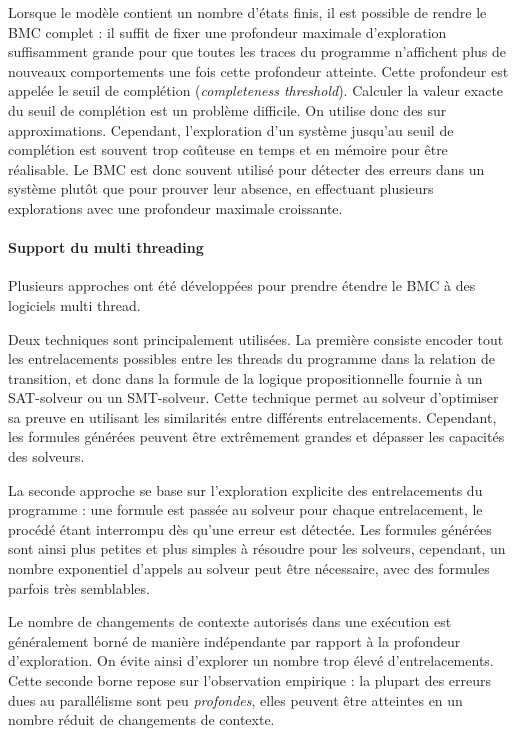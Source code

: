 Lorsque le modèle contient un nombre d'états finis, il est possible de rendre le
\ac{BMC} complet : il suffit de fixer une profondeur maximale d'exploration
suffisamment grande pour que toutes les traces du programme n'affichent plus de
nouveaux comportements une fois cette profondeur atteinte. Cette profondeur est appelée le seuil de
complétion (\emph{completeness threshold}). Calculer la valeur exacte du seuil de
complétion est un problème difficile. On utilise donc des sur approximations.
Cependant, l'exploration d'un système jusqu'au seuil de complétion est souvent
trop coûteuse en temps et en mémoire pour être réalisable. Le \ac{BMC} est donc
souvent utilisé pour détecter des erreurs dans un système plutôt que pour
prouver leur absence, en effectuant plusieurs explorations avec une profondeur
maximale croissante.

\paragraph{Support du multi threading}

Plusieurs approches ont été développées pour prendre étendre le \ac{BMC} à des
logiciels multi thread\cite{ESBMC_multithread}.

Deux techniques sont principalement utilisées.
La première consiste encoder tout les entrelacements possibles entre les threads
du programme dans la relation de transition, et donc dans la formule de la
logique propositionnelle fournie à un SAT-solveur ou un SMT-solveur. Cette
technique permet au solveur d'optimiser sa preuve en utilisant les similarités
entre différents entrelacements. Cependant, les formules générées peuvent être
extrêmement grandes et dépasser les capacités des solveurs.

La seconde approche se base sur l'exploration explicite des entrelacements du
programme : une formule est passée au solveur pour chaque entrelacement, le
procédé étant interrompu dès qu'une erreur est détectée. Les formules générées
sont ainsi plus petites et plus simples à résoudre pour les solveurs, cependant,
un nombre exponentiel d'appels au solveur peut être nécessaire, avec des
formules parfois très semblables.

Le nombre de changements de contexte autorisés dans une exécution est
généralement borné de manière indépendante par rapport à la profondeur
d'exploration. On évite ainsi d'explorer un nombre trop élevé d'entrelacements.
Cette seconde borne repose sur l'observation empirique : la plupart des erreurs
dues au parallélisme sont peu \emph{profondes}, elles peuvent être atteintes en
un nombre réduit de changements de contexte.

